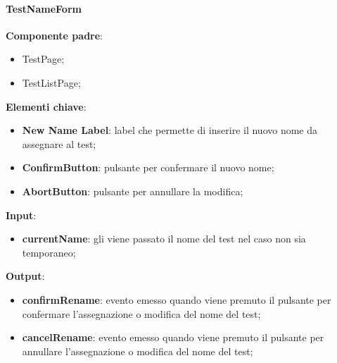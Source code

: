 \paragraph{TestNameForm}
\textbf{Componente padre}:
\begin{itemize}
    \item TestPage;
    \item TestListPage;
\end{itemize}
\textbf{Elementi chiave}:
\begin{itemize}
    \item \textbf{New Name Label}: label che permette di inserire il nuovo nome da assegnare al test;
    \item \textbf{ConfirmButton}: pulsante per confermare il nuovo nome;
    \item \textbf{AbortButton}: pulsante per annullare la modifica;
\end{itemize}
\textbf{Input}:
\begin{itemize}
    \item \textbf{currentName}: gli viene passato il nome del test nel caso non sia temporaneo;
\end{itemize}
\textbf{Output}:
\begin{itemize}
    \item \textbf{confirmRename}: evento emesso quando viene premuto il pulsante per confermare l'assegnazione o modifica del nome del test;
    \item \textbf{cancelRename}: evento emesso quando viene premuto il pulsante per annullare l'assegnazione o modifica del nome del test;
\end{itemize}
